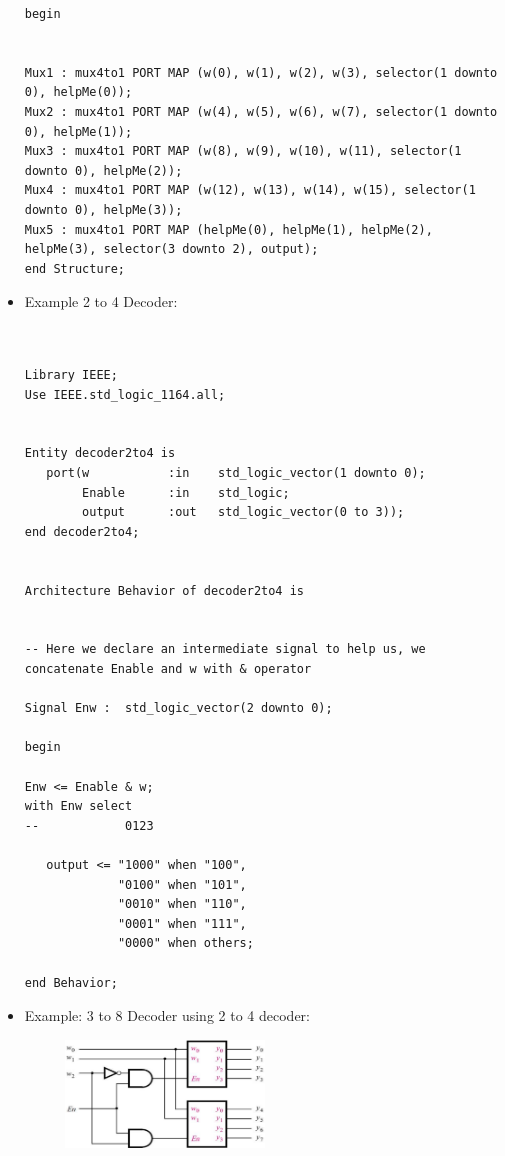 \documentclass[a4paper]{article}
\begin{document}
\begin{itemize}
\begin{verbatim}
begin 


Mux1 : mux4to1 PORT MAP (w(0), w(1), w(2), w(3), selector(1 downto 0), helpMe(0));
Mux2 : mux4to1 PORT MAP (w(4), w(5), w(6), w(7), selector(1 downto 0), helpMe(1));
Mux3 : mux4to1 PORT MAP (w(8), w(9), w(10), w(11), selector(1 downto 0), helpMe(2));
Mux4 : mux4to1 PORT MAP (w(12), w(13), w(14), w(15), selector(1 downto 0), helpMe(3));
Mux5 : mux4to1 PORT MAP (helpMe(0), helpMe(1), helpMe(2), helpMe(3), selector(3 downto 2), output);
end Structure;

\end{verbatim}


\item Example 2 to 4 Decoder:

\begin{verbatim}


Library IEEE;
Use IEEE.std_logic_1164.all;


Entity decoder2to4 is 
   port(w           :in    std_logic_vector(1 downto 0);
        Enable      :in    std_logic;
        output      :out   std_logic_vector(0 to 3));
end decoder2to4;


Architecture Behavior of decoder2to4 is


-- Here we declare an intermediate signal to help us, we concatenate Enable and w with & operator

Signal Enw :  std_logic_vector(2 downto 0);

begin 

Enw <= Enable & w;
with Enw select
--            0123

   output <= "1000" when "100",
             "0100" when "101",
             "0010" when "110",
             "0001" when "111",
             "0000" when others;

end Behavior;

\end{verbatim}

\item Example: 3 to 8 Decoder using 2 to 4 decoder:


\begin{figure}[H] 
	\centering
	\includegraphics[width=0.5\textwidth]{3 to 8 Decoder using 2 to 4 decoder}
	\label{fig:raw data}
\end{figure}



\end{itemize}
\end{document}
